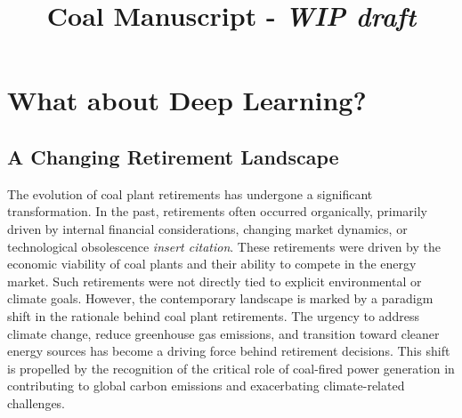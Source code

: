 \documentclass{article}
\title{Coal Manuscript - \textit{WIP draft}}
\author{}
\date{}
\begin{document}
\maketitle
















\section{What about Deep Learning?}

\subsection{A Changing Retirement Landscape}

The evolution of coal plant retirements has undergone a significant transformation. 
In the past, retirements often occurred organically, primarily driven by internal financial considerations, 
changing market dynamics, or technological obsolescence \textit{insert citation}. 
These retirements were driven by the economic viability of coal plants and their ability to compete 
in the energy market. Such retirements were not directly tied to explicit environmental or climate goals. 
However, the contemporary landscape is marked by a paradigm shift in the rationale behind coal plant retirements. 
The urgency to address climate change, reduce greenhouse gas emissions, and transition toward cleaner energy 
sources has become a driving force behind retirement decisions. This shift is propelled by the recognition of 
the critical role of coal-fired power generation in contributing to global carbon emissions and exacerbating 
climate-related challenges.
\end{document}
